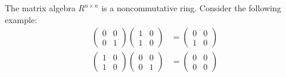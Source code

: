 \begin{example}\label{ex:matrix_multiplication_is_noncommutative}
  The matrix algebra \( R^{n \times n} \) is a noncommutative ring. Consider the following example:
  \begin{align*}
    \begin{pmatrix}
      0 & 0 \\
      0 & 1
    \end{pmatrix}
    \begin{pmatrix}
      1 & 0 \\
      1 & 0
    \end{pmatrix}
    &=
    \begin{pmatrix}
      0 & 0 \\
      1 & 0
    \end{pmatrix}
    \\
    \begin{pmatrix}
      1 & 0 \\
      1 & 0
    \end{pmatrix}
    \begin{pmatrix}
      0 & 0 \\
      0 & 1
    \end{pmatrix}
    &=
    \begin{pmatrix}
      0 & 0 \\
      0 & 0
    \end{pmatrix}
  \end{align*}
\end{example}

